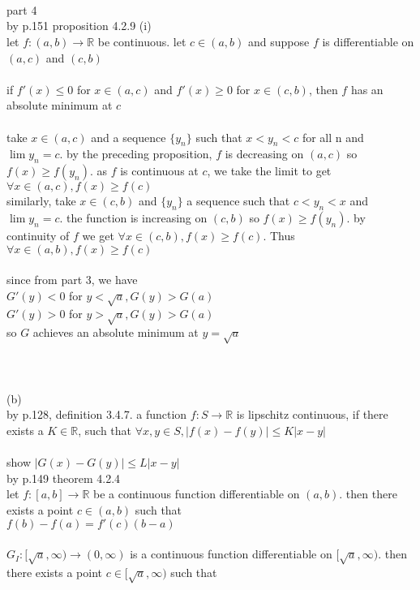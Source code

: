 \documentclass[12pt, border = 4pt, multi]{article} %
\begin{document}
\\
\\
\\
part 4\\
by p.151 proposition 4.2.9 (i)\\
let $f: (a, b) \rightarrow \mathbb{R}$ be continuous. let $c \in (a, b)$ and suppose $f$ is differentiable on $(a, c)$ and $(c, b)$\\
\\
if $f'(x) \leq 0$ for $x \in (a, c)$ and $f'(x) \geq 0$ for $x \in (c,b)$, then $f$ has an absolute minimum at $c$\\
\\
take $x \in (a, c)$ and a sequence
$\{y_n\}$ such that $x < y_n < c$ for all n and $\lim y_n = c$. by the preceding proposition, $f$ is decreasing on
$(a, c)$ so $f(x) \geq f(y_n)$. as $f$ is continuous at $c$, we take the limit to get $\forall x \in (a, c), f(x) \geq f(c)$\\
similarly, take $x \in (c, b)$ and $\{y_n\}$ a sequence such that $c < y_n < x$ and $\lim y_n = c$. the function
is increasing on $(c, b)$ so $f(x) \geq f(y_n)$. by continuity of $f$ we get $ \forall x \in (c, b), f(x) \geq f(c)$.
Thus $\forall x \in (a,b), f(x) \geq f(c)$\\
\\
since from part 3, we have\\
$G'(y) < 0$ for $y < \sqrt{a}, G(y) > G(a)$\\
$G'(y) > 0$ for $y > \sqrt{a}, G(y) > G(a)$\\
so $G$ achieves an absolute minimum at $y = \sqrt{a}$\\
\\
\\
\\
(b)\\
by p.128, definition 3.4.7. a function $f: S \rightarrow \mathbb{R}$ is lipschitz continuous, if there exists a $K \in \mathbb{R}$, such that
$\forall x, y \in S, |f(x) - f(y)| \leq K|x - y|$\\
\\
show $|G(x) - G(y)| \leq L|x - y|$\\
by p.149 theorem 4.2.4\\
let $f: [a, b] \rightarrow \mathbb{R}$ be a continuous function differentiable on
$(a, b)$. then there exists a point $c \in (a, b)$ such that\\
$f(b) - f(a) = f'(c)(b - a)$\\
\\
$G_I: [\sqrt{a}, \infty) \rightarrow (0, \infty)$ is a continuous function differentiable on $[\sqrt{a}, \infty)$. then there exists a point $c \in [\sqrt{a}, \infty)$ such that
\end{document}
